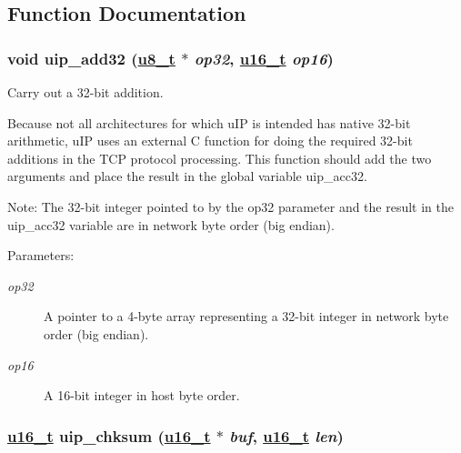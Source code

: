 \subsection{Function Documentation}
\hypertarget{a00066_g6832e4d2d046536b6472f7ac92340f68}{
\subsubsection[uip\_\-add32]{\setlength{\rightskip}{0pt plus 5cm}void uip\_\-add32 (\hyperlink{a00070_ge081489b4906f65a3cb18e9fbe9f8d23}{u8\_\-t} $\ast$ {\em op32}, \hyperlink{a00070_gfc6499c1f28697aa3bfc2804d496fd11}{u16\_\-t} {\em op16})}}
\label{a00066_g6832e4d2d046536b6472f7ac92340f68}


Carry out a 32-bit addition. 

Because not all architectures for which u\-IP is intended has native 32-bit arithmetic, u\-IP uses an external C function for doing the required 32-bit additions in the TCP protocol processing. This function should add the two arguments and place the result in the global variable uip\_\-acc32.

\begin{Desc}
\item[Note:]The 32-bit integer pointed to by the op32 parameter and the result in the uip\_\-acc32 variable are in network byte order (big endian).\end{Desc}
\begin{Desc}
\item[Parameters:]
\begin{description}
\item[{\em op32}]A pointer to a 4-byte array representing a 32-bit integer in network byte order (big endian).\item[{\em op16}]A 16-bit integer in host byte order. \end{description}
\end{Desc}
\hypertarget{a00066_gb6683dd83fe1c8de9a24086d4b69e907}{
\subsubsection[uip\_\-chksum]{\setlength{\rightskip}{0pt plus 5cm}\hyperlink{a00070_gfc6499c1f28697aa3bfc2804d496fd11}{u16\_\-t} uip\_\-chksum (\hyperlink{a00070_gfc6499c1f28697aa3bfc2804d496fd11}{u16\_\-t} $\ast$ {\em buf}, \hyperlink{a00070_gfc6499c1f28697aa3bfc2804d496fd11}{u16\_\-t} {\em len})}}
\label{a00066_gb6683dd83fe1c8de9a24086d4b69e907}


